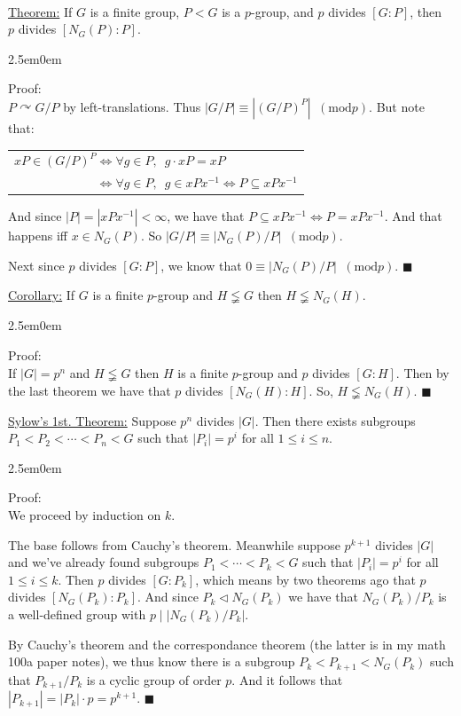 \documentclass{book}
\newcommand{\hTwo}{%
\color{Black}%
   \fontsize{13}{15}\selectfont%
}
\newcommand{\exTwo}{%
   \color{Purple}%
   \fontsize{13}{15}\selectfont%
}
\newcommand{\exThreeP}{%
   \color{RedViolet}%
   \fontsize{12}{14}\selectfont%
}
\newenvironment{myIndent}{%
   \begin{adjustwidth}{2.5em}{0em}%
}{%
   \end{adjustwidth}%
}
\newcommand{\gap}{\phantom{2}}
\newcommand{\divides}{\mathop{\mid}}
\newcommand{\mMod}[1]{\phantom{a}(\mathrel{\mathrm{mod}} #1)}
\newcommand{\mySepTwo}[1][.]{%
   {\noindent\color{#1}{\rule{6.5in}{0.5mm}}}\\%
}
\newcommand{\retTwo}{\hfill\bigbreak}
\begin{document}
\hTwo\mySepTwo

\exTwo\ul{Theorem:} If $G$ is a finite group, $P < G$ is a $p$-group, and $p$ divides $[G : P]$, then\\ $p$ divides $[N_G(P) : P]$.
\begin{myIndent}\exThreeP
	Proof:\\
	$P \curvearrowright G/P$ by left-translations. Thus $|G/P| \equiv |(G/P)^P| \mMod{p}$. But note that:

	{\center\begin{tabular}{l}
		$xP \in (G/P)^P \Longleftrightarrow \forall g \in P,\gap g \cdot xP = xP$\\ [4pt]
		$\phantom{xP \in (G/P)^P} \Longleftrightarrow \forall g \in P,\gap g \in xPx^{-1} \Longleftrightarrow P \subseteq xPx^{-1}$
	\end{tabular} \retTwo\par}

	And since $|P| = |xPx^{-1}| < \infty$, we have that $P \subseteq xPx^{-1} \Longleftrightarrow P = xPx^{-1}$. And that happens iff $x \in N_G(P)$. So $|G/P| \equiv |N_G(P)/P| \mMod{p}$.\retTwo

	Next since $p$ divides $[G : P]$, we know that $0 \equiv |N_G(P)/P| \mMod{p}$. $\blacksquare$\retTwo
\end{myIndent}

\exTwo\ul{Corollary:} If $G$ is a finite $p$-group and $H \lneqq G$ then $H \lneqq N_G(H)$.\newpage
\begin{myIndent}\exThreeP
	Proof:\\
	If $|G| = p^n$ and $H \lneqq G$ then $H$ is a finite $p$-group and $p$ divides $[G : H]$. Then by the last theorem we have that $p$ divides $[N_G(H) : H]$. So, $H \lneqq N_G(H)$. $\blacksquare$\retTwo
\end{myIndent}

\ul{Sylow's 1st. Theorem:} Suppose $p^n$ divides $|G|$. Then there exists subgroups\\ $P_1 < P_2 < \cdots < P_n < G$ such that $|P_i| = p^i$ for all $1 \leq i \leq n$.
\begin{myIndent}\exThreeP
	Proof:\\
	We proceed by induction on $k$.\retTwo

	The base follows from Cauchy's theorem. Meanwhile suppose $p^{k+1}$ divides $|G|$ and we've already found subgroups $P_1 < \cdots < P_k < G$ such that $|P_i| = p^i$ for all $1 \leq i \leq k$. Then $p$ divides $[G : P_k]$, which means by two theorems ago that $p$ divides $[N_G(P_k) : P_k]$. And since $P_k \lhd N_G(P_k)$ we have that $N_G(P_k) / P_k$ is a well-defined group with $p \divides |N_G(P_k) / P_k|$.\retTwo

	By Cauchy's theorem and the correspondance theorem (the latter is in my math 100a paper notes), we thus know there is a subgroup $P_k < P_{k+1} < N_G(P_k)$ such that $P_{k+1}/P_k$ is a cyclic group of order $p$. And it follows that $|P_{k+1}| = |P_k| \cdot p = p^{k+1}$. $\blacksquare$\retTwo
\end{myIndent}
\end{document}
